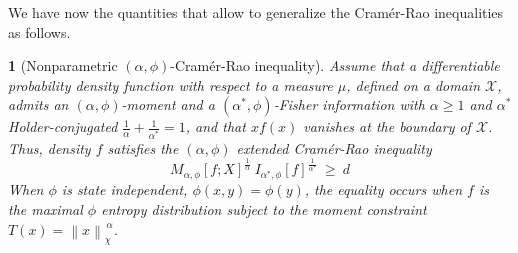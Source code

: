 \documentclass[english,sort&compress]{elsarticle}
\theoremstyle{definition}
\theoremstyle{plain}
\newtheorem{prop}{\protect\propositionname}
\theoremstyle{plain}
\providecommand{\propositionname}{Proposition}
\def\X{\mathcal{X}}
\begin{document}
We  have  now   the  quantities  that  allow  to   generalize  the  Cram\'er-Rao
inequalities as follows.
%
\begin{prop}[Nonparametric                           $(\alpha,\phi)$-Cram\'er-Rao
  inequality]\label{prop:np-phi-CR}
  Assume that  a differentiable probability  density function with respect  to a
  measure $\mu$, defined on a  domain $\X$, admits an $(\alpha,\phi)$-moment and
  a  $(\alpha^*,\phi)$-Fisher information  with  $\alpha \ge  1$ and  $\alpha^*$
  Holder-conjugated  $\frac{1}{\alpha} +  \frac{1}{\alpha^*} =  1$, and  that $x
  f(x)$  vanishes at  the boundary  of $\X$.   Thus, density  $f$  satisfies the
  $(\alpha,\phi)$ extended Cram\'er-Rao inequality
  \begin{equation}\label{eq:np-phi-CR}
   M_{\alpha,\phi}[f;X]^{\frac{1}{\alpha}} \: I_{\alpha^*\!,\phi}[f]^{\frac{1}{\alpha^*}}
   \: \ge \: d
  \end{equation}
  When $\phi$ is  state independent, $\phi(x,y) = \phi(y)$,  the equality occurs
  when  $f$ is the  maximal $\phi$  entropy distribution  subject to  the moment
  constraint $T(x) = \left\| x \right\|_{\chi}^{\, \alpha}$.
\end{prop}
\end{document}
